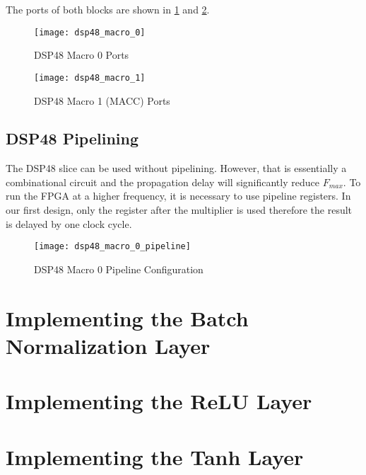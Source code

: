 The ports of both blocks are shown in \ref{fig:dsp48_macro_0} and \ref{fig:dsp48_macro_1}.

\begin{figure}[h]
  \centering
  \texttt{[image: dsp48\_macro\_0]}
  \caption{DSP48 Macro 0 Ports}
  \label{fig:dsp48_macro_0}
\end{figure}

\begin{figure}[h]
  \centering
  \texttt{[image: dsp48\_macro\_1]}
  \caption{DSP48 Macro 1 (MACC) Ports}
  \label{fig:dsp48_macro_1}
\end{figure}

\subsection{DSP48 Pipelining}

The DSP48 slice can be used without pipelining. However, that is essentially a combinational circuit and
the propagation delay will significantly reduce $F_{max}$. To run the FPGA at a higher frequency, it is
necessary to use pipeline registers. In our first design, only the register after the multiplier is used
therefore the result is delayed by one clock cycle.

\begin{figure}[h]
  \centering
  \texttt{[image: dsp48\_macro\_0\_pipeline]}
  \caption{DSP48 Macro 0 Pipeline Configuration}
  \label{fig:dsp48_macro_0_pipeline}
\end{figure}

\section{Implementing the Batch Normalization Layer}
\section{Implementing the ReLU Layer}
\section{Implementing the Tanh Layer}

\clearpage %
